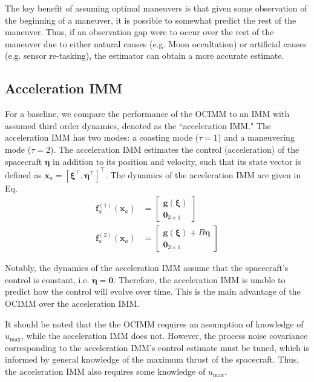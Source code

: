\documentclass[letterpaper, preprint, paper,11pt]{AAS}	%
\begin{document}
The key benefit of assuming optimal maneuvers is that given some observation of the beginning of a maneuver, it is possible to somewhat predict the rest of the maneuver. Thus, if an observation gap were to occur over the rest of the maneuver due to either natural causes (e.g. Moon occultation) or artificial causes (e.g. sensor re-tasking), the estimator can obtain a more accurate estimate. 

\subsection{Acceleration IMM}

For a baseline, we compare the performance of the OCIMM to an IMM with assumed third order dynamics, denoted as the ``acceleration IMM." The acceleration IMM has two modes: a coasting mode ($\tau = 1$) and a maneuvering mode ($\tau = 2$). The acceleration IMM estimates the control (acceleration) of the spacecraft $\bm{\eta}$ in addition to its position and velocity, such that its state vector is defined as $\bm{x}_a = [\bm{\xi}^\top, \bm{\eta}^\top]^\top$. The dynamics of the acceleration IMM are given in Eq. 
\begin{align}
    \bm{f}^{(1)}_a (\bm{x}_a) &= \begin{bmatrix}
        \bm{g}(\bm{\xi}) \\
        \bm{0}_{3 \times 1}
    \end{bmatrix} \label{eq:accel-IMM-coasting-dynamics} \\
    \bm{f}^{(2)}_a (\bm{x}_a) &= \begin{bmatrix}
        \bm{g}(\bm{\xi}) + B \bm{\eta} \\
        \bm{0}_{3 \times 1}
    \end{bmatrix} \label{eq:accel-IMM-thrusting-dynamics}
\end{align}

Notably, the dynamics of the acceleration IMM assume that the spacecraft's control is constant, i.e. $\dot{\bm{\eta}} = \bm{0}$. Therefore, the acceleration IMM is unable to predict how the control will evolve over time. This is the main advantage of the OCIMM over the acceleration IMM.

It should be noted that the the OCIMM requires an assumption of knowledge of $u_\text{max}$, while the acceleration IMM does not. However, the process noise covariance corresponding to the acceleration IMM's control estimate must be tuned, which is informed by general knowledge of the maximum thrust of the spacecraft. Thus, the acceleration IMM also requires some knowledge of $u_\text{max}$. 
\end{document}
